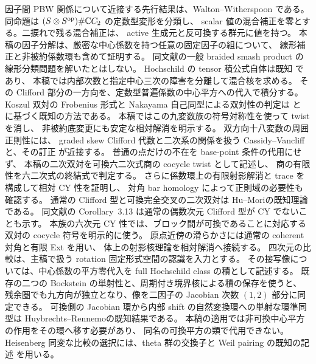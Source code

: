 因子間 PBW 関係について近接する先行結果は、Walton--Witherspoon
\cite[Hypothesis~2.6, Proposition~6.2]{CMOWaltonWitherspoonBraided}である。
同命題は $(S\otimes S^{\mathrm{op}})\#\mathbb C C_2$ の定数型変形を分類し、
scalar 値の混合補正を零とする。二捩れで残る混合補正は、
active 生成元と反可換する群元に値を持つ。
本稿の因子分解は、厳密な中心係数を持つ任意の固定因子の組について、
線形補正と非被約係数環も含めて証明する。
同文献の一般 braided smash product の線形分類問題を解いたとはしない。
Hochschild の tensor 積公式自体は既知
\cite[Theorem~3.1.2]{CMOWitherspoonHochschild}であり、
本稿では内部次数と指定中心三次の障害を分離して混合核を求める。
その Clifford 部分の一方向を、定数型普遍係数の中心平方への代入で積分する。
Koszul 双対の Frobenius 形式と Nakayama 自己同型による双対性の判定は
\cite[Theorem~6.3, Proposition~6.4]{IFRBergerMarconnet}と
\cite[Lemmas~1.1--1.2]{IFRHeVanOystaeyenZhang}に基づく既知の方法である。
本稿ではこの九変数族の符号対称性を使って twist を消し、
非被約底変更にも安定な相対解消を明示する。
双方向十八変数の周囲正則性には、
graded skew Clifford 代数と二次系の関係を扱う
Cassidy--Vancliff\cite[Theorem~4.2]{IFBCassidyVancliff}と、その訂正
\cite[Proposition~10, Corollary~11]{IFBCassidyVancliffCorr}が近接する。
普通の点だけの不在を base-point 条件の代用にせず、
本稿の二次双対を可換六二次式商の cocycle twist として記述し、
商の有限性を六二次式の終結式で判定する。
さらに係数環上の有限射影解消と trace を構成して相対 CY 性を証明し、
対角 bar homology によって正則域の必要性も確認する。
通常の Clifford 型と可換完全交叉の二次双対は
Hu--Mori\cite[Theorems~3.21, 3.28]{IFBHuMori}の既知理論である。
同文献の Corollary~3.13 は通常の偶数次元 Clifford 型が CY でないことも示す。
本族の六次元 CY 性では、ブロック間が可換であることに対応する
双対の cocycle 符号を明示的に使う。
原点近傍の滑らかさには通常の coherent 対角と有限 Ext を用い、
体上の射影核理論\cite{CMOBallardFarman}を相対解消へ接続する。
四次元の比較は、主稿で扱う rotation 固定形式空間の認識を入力とする。
その接写像については、中心係数の平方零代入を full Hochschild class の積として記述する。
既存の二つの Bockstein の単射性と、周期付き境界核による積の保存を使うと、
残余圏でも九方向が独立となり、像を二因子の Jacobian 次数 $(1,2)$ 部分に同定できる。
可換側の Jacobian 環から内部 shift の自然変換環への単射な環準同型は
Huybrechts--Rennemo\cite[Propositions~3.3, 3.5, 3.9]{NFHuybrechtsRennemo}の既知結果である。
本稿の適用では非可換中心平方の作用をその環へ移す必要があり、
同名の可換平方の類で代用できない。
Heisenberg 同変な比較の選択には、theta 群の交換子と Weil pairing の既知の記述
\cite[Definition~1.29, Lemmas~1.27, 4.8]{NFMCremonaFisherDescentAlgebra}を用いる。

